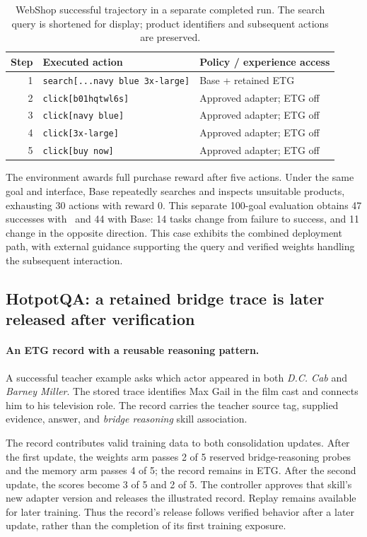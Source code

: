 \begin{table}[h]
\centering\small\setlength{\tabcolsep}{5pt}
\caption{WebShop successful trajectory in a separate completed run. The search query is shortened for display; product identifiers and subsequent actions are preserved.}
\label{tab:case-webshop-actions}
\begin{tabular}{rll}
\toprule
Step & Executed action & Policy / experience access\\
\midrule
1 & \texttt{search[...navy blue 3x-large]} & Base + retained ETG\\
2 & \texttt{click[b01hqtwl6s]} & Approved adapter; ETG off\\
3 & \texttt{click[navy blue]} & Approved adapter; ETG off\\
4 & \texttt{click[3x-large]} & Approved adapter; ETG off\\
5 & \texttt{click[buy now]} & Approved adapter; ETG off\\
\bottomrule
\end{tabular}
\end{table}

The environment awards full purchase reward after five actions. Under the same goal and interface, Base repeatedly searches and inspects unsuitable products, exhausting 30 actions with reward 0. This separate 100-goal evaluation obtains 47 successes with \method\ and 44 with Base: 14 tasks change from failure to success, and 11 change in the opposite direction. This case exhibits the combined deployment path, with external guidance supporting the query and verified weights handling the subsequent interaction.

\subsection{HotpotQA: a retained bridge trace is later released after verification}
\label{app:case-hotpotqa}
\paragraph{An ETG record with a reusable reasoning pattern.}
A successful teacher example asks which actor appeared in both \emph{D.C. Cab} and \emph{Barney Miller}. The stored trace identifies Max Gail in the film cast and connects him to his television role. The record carries the teacher source tag, supplied evidence, answer, and \emph{bridge reasoning} skill association.

The record contributes valid training data to both consolidation updates. After the first update, the weights arm passes 2 of 5 reserved bridge-reasoning probes and the memory arm passes 4 of 5; the record remains in ETG. After the second update, the scores become 3 of 5 and 2 of 5. The controller approves that skill's new adapter version and releases the illustrated record. Replay remains available for later training. Thus the record's release follows verified behavior after a later update, rather than the completion of its first training exposure.

